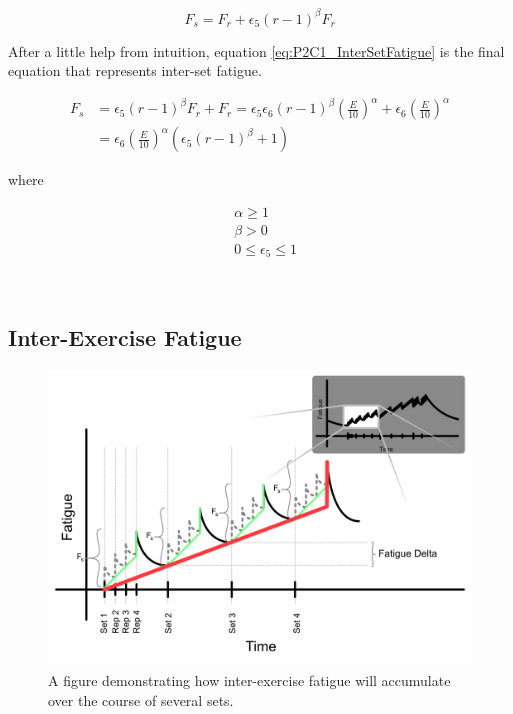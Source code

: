 \begin{equation*}
	F_s =
	F_{r} + \epsilon_5 (r-1)^\beta F_r
\end{equation*}

After a little help from intuition, equation \ref{eq:P2C1_InterSetFatigue} is the final equation that represents inter-set fatigue.

\begin{minipage}{\textwidth}
	\begin{equation}
		\label{eq:P2C1_InterSetFatigue}
		\begin{split}
			F_s & = \epsilon_5 (r-1) ^ \beta F_r + F_r
			= \epsilon_5 \epsilon_6 (r-1)^\beta \left( 
				\frac{E}{10} 
			\right)^\alpha
			+ \epsilon_6 \left( \frac{E}{10} \right)^\alpha
			\\
			& = 
			\epsilon_6 \left( \frac{E}{10} \right)^\alpha
			\left(
				\epsilon_5 (r-1)^\beta + 1
			\right)
		\end{split}
	\end{equation}
	\centerline{where}
	\begin{equation*}
		\begin{split}
		    & \alpha \ge 1 \\
		    & \beta > 0 \\
			& 0 \le \epsilon_5 \le 1
		\end{split}
	\end{equation*}
\end{minipage}\\

\subsection{Inter-Exercise Fatigue}
\label{sec:P2C1_InterExerciseFatigue}

\begin{figure}[htb]
    \centering
    \includegraphics[scale=0.55]{images/ch2/InterExerciseFatigue.png}
    \caption{A figure demonstrating how inter-exercise fatigue will accumulate over the course of several sets.}
    \label{fig:P2C1_InterExerciseFatigue}
\end{figure}

